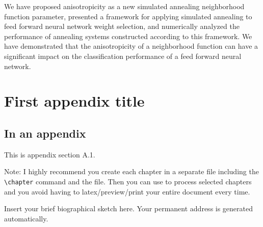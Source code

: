 \documentclass[11pt]{afthesis}
\begin{document}
	We have proposed anisotropicity as a new simulated annealing neighborhood function parameter, presented a framework for applying simulated annealing to feed forward neural network weight selection, and numerically analyzed the performance of annealing systems constructed according to this framework. We have demonstrated that the anisotropicity of a neighborhood function can have a significant impact on the classification performance of a feed forward neural network.  
	
	\label{scn:conclusion}
	\appendix		%
	
	\chapter{First appendix title}
	
	\section{In an appendix} 
	
	This is appendix section A.1.
	
	Note: I highly recommend you create each chapter in a separate file
	including the \verb|\chapter| command and \verb|| the file.
	Then you can use \verb|| to process selected chapters and
	you avoid having to latex/preview/print your entire document every
	time.
	
	
	
	
	
	
	\begin{vita}
		Insert your brief biographical sketch here. Your permanent
		address is generated automatically.
	\end{vita}
	
	
\end{document}
